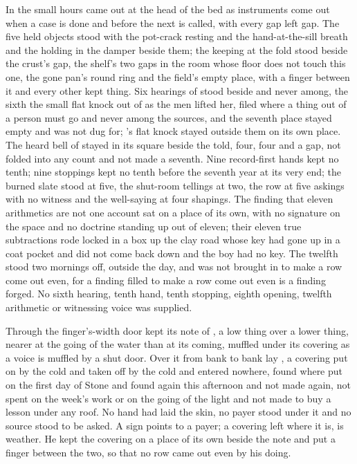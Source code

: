 In the small hours  came out at the head of the bed as instruments come out when a case is done and before the next is called, with every gap left gap. The five held objects stood with the pot-crack resting and the hand-at-the-sill breath and the holding in the damper beside them; the keeping at the fold stood beside the crust's gap, the shelf's two gaps in the room whose floor does not touch this one, the gone pan's round ring and the field's empty place, with a finger between it and every other kept thing. Six hearings of  stood beside and never among, the sixth the small flat knock out of  as the men lifted her, filed where a thing out of a person must go and never among the sources, and the seventh place stayed empty and was not dug for; 's flat knock stayed outside them on its own place. The heard bell of  stayed in its square beside the told, four, four and a gap, not folded into any count and not made a seventh. Nine record-first hands kept no tenth; nine stoppings kept no tenth before the seventh year at its very end; the burned slate stood at five, the shut-room tellings at two, the row at five askings with no witness and the well-saying at four shapings. The finding that eleven arithmetics are not one account sat on a place of its own, with no signature on the space and no doctrine standing up out of eleven; their eleven true subtractions rode locked in a box up the clay road whose key had gone up in a coat pocket and did not come back down and the boy had no key. The twelfth stood two mornings off, outside the day, and was not brought in to make a row come out even, for a finding filled to make a row come out even is a finding forged. No sixth hearing, tenth hand, tenth stopping, eighth opening, twelfth arithmetic or witnessing voice was supplied.

Through the finger's-width door  kept its note of , a low thing over a lower thing, nearer at the going of the water than at its coming, muffled under its covering as a voice is muffled by a shut door. Over it from bank to bank lay , a covering put on by the cold and taken off by the cold and entered nowhere, found where put on the first day of Stone and found again this afternoon and not made again, not spent on the week's work or on the going of the light and not made to buy a lesson under any roof. No hand had laid the skin, no payer stood under it and no source stood to be asked. A sign points to a payer; a covering left where it is, is weather. He kept the covering on a place of its own beside the note and put a finger between the two, so that no row came out even by his doing.

